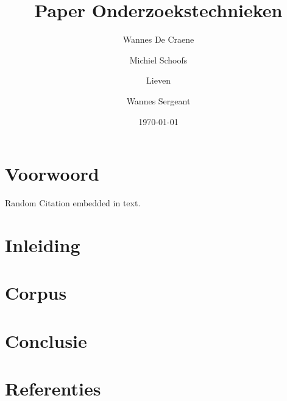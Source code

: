 \documentclass[12pt,a4paper]{article}
\author{Wannes {De Craene} \and Michiel Schoofs \and Lieven \and Wannes Sergeant}
\title{Paper Onderzoekstechnieken}
\date{\today}
\begin{document}
    
    \maketitle
    \tableofcontents
    
    \section{Voorwoord}
    
    Random Citation \cite{Auteur2019} embedded in text.
    \section{Inleiding}
    
    
    \section{Corpus}
    
    
    \section{Conclusie}
    
    \newpage
    \section{Referenties}

    
    
    
\end{document}
